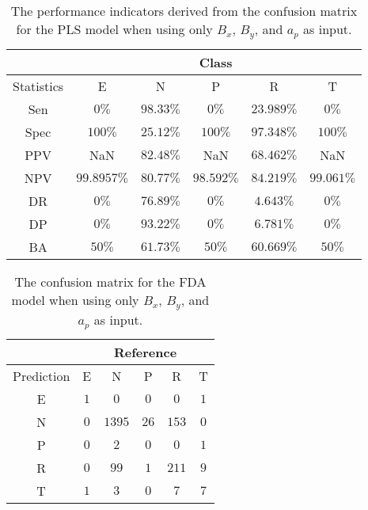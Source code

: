 \begin{table}[!ht]
	\centering
	\begin{tabular}{|c|c|c|c|c|c|}
		\hline
		 & \multicolumn{5}{c|}{Class} \\ \hline
		Statistics & E & N & P & R & T \\ \hline
		Sen & $0\%$ & $98.33\%$ & $0\%$ & $23.989\%$ & $0\%$ \\ \hline
		Spec & $100\%$ & $25.12\%$ & $100\%$ & $97.348\%$ & $100\%$ \\ \hline
		PPV & NaN & $82.48\%$ & NaN & $68.462\%$ & NaN \\ \hline
		NPV & $99.8957\%$ & $80.77\%$ & $98.592\%$ & $84.219\%$ & $99.061\%$ \\ \hline
		DR & $0\%$ & $76.89\%$ & $0\%$ & $4.643\%$ & $0\%$ \\ \hline
		DP & $0\%$ & $93.22\%$ & $0\%$ & $6.781\%$ & $0\%$ \\ \hline
		BA & $50\%$ & $61.73\%$ & $50\%$ & $60.669\%$ & $50\%$ \\ \hline
	\end{tabular}
	\caption{The performance indicators derived from the confusion matrix for the PLS model when using only $B_{x}$, $B_{y}$, and $a_{p}$ as input.}
	\label{tab:cs:reverse:xyap:pls}
\end{table}

\begin{table}[!ht]
	\centering
	\begin{tabular}{|c|c|c|c|c|c|}
		\hline
		 & \multicolumn{5}{|c|}{Reference} \\ \hline
		 Prediction & E & N & P & R & T \\ \hline
		 E & $1$ & $0$ & $0$ & $0$ & $1$ \\ \hline
		 N & $0$ & $1395$ & $26$ & $153$ & $0$ \\ \hline
		 P & $0$ & $2$ & $0$ & $0$ & $1$ \\ \hline
		 R & $0$ & $99$ & $1$ & $211$ & $9$ \\ \hline
		 T & $1$ & $3$ & $0$ & $7$ & $7$ \\ \hline
	\end{tabular}
	\caption{The confusion matrix for the FDA model when using only $B_{x}$, $B_{y}$, and $a_{p}$ as input.}
	\label{tab:cm:xyap:fda}
\end{table}


